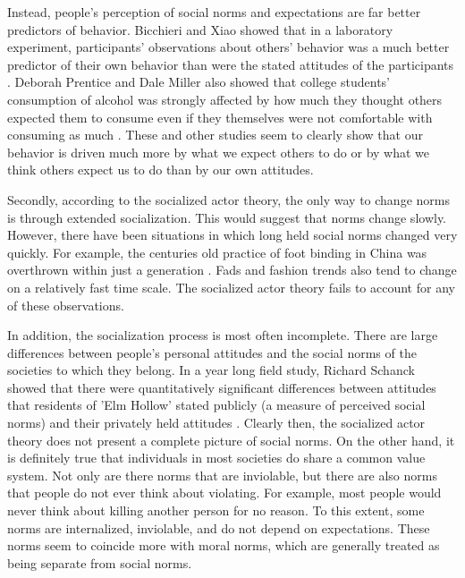 \documentclass[rutwik_proposal.tex]{subfiles}
\begin{document}
Instead, people's perception of social norms and expectations are far better predictors of behavior. Bicchieri and Xiao showed that in a laboratory experiment, participants' observations about others' behavior was a much better predictor of their own behavior than were the stated attitudes of the participants \cite{Bicchieri09}. Deborah Prentice and Dale Miller also showed that college students' consumption of alcohol was strongly affected by how much they thought others expected them to consume even if they themselves were not comfortable with consuming as much \cite{Prentice93}. These and other studies seem to clearly show that our behavior is driven much more by what we expect others to do or by what we think others expect us to do than by our own attitudes.

Secondly, according to the socialized actor theory, the only way to change norms is through extended socialization. This would suggest that norms change slowly. However, there have been situations in which long held social norms changed very quickly. For example, the centuries old practice of foot binding in China was overthrown within just a generation \cite{Mackie96}. Fads and fashion trends also tend to change on a relatively fast time scale. The socialized actor theory fails to account for any of these observations.

In addition, the socialization process is most often incomplete. There are large differences between people's personal attitudes and the social norms of the societies to which they belong. In a year long field study, Richard Schanck showed that there were quantitatively significant differences between attitudes that residents of 'Elm Hollow' stated publicly (a measure of perceived social norms) and their privately held attitudes \cite{Schanck32}. Clearly then, the socialized actor theory does not present a complete picture of social norms. On the other hand, it is definitely true that individuals in most societies do share a common value system. Not only are there norms that are inviolable, but there are also norms that people do not ever think about violating. For example, most people would never think about killing another person for no reason. To this extent, some norms are internalized, inviolable, and do not depend on expectations. These norms seem to coincide more with moral norms, which are generally treated as being separate from social norms.
\end{document}
